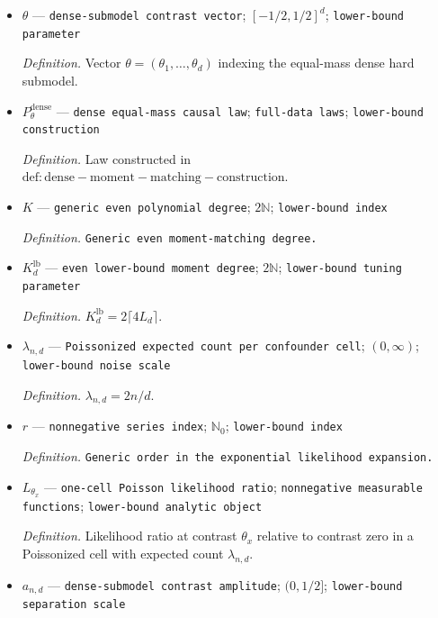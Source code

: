\documentclass{article}
\begin{document}
\begin{itemize}
  \par\smallskip\noindent\emph{Definition.} \texttt{Second probability vector in the normalized two-\allowbreak{}sample distance experiment.}
  \item \(\theta\) --- \texttt{dense-\allowbreak{}submodel contrast vector}; \([-1/2,1/2]^d\); \texttt{lower-\allowbreak{}bound parameter}
  \par\smallskip\noindent\emph{Definition.} Vector \(\theta=(\theta_1,\ldots,\theta_d)\) indexing the equal-mass dense hard submodel.
  \item \(P_\theta^{\mathrm{dense}}\) --- \texttt{dense equal-\allowbreak{}mass causal law}; \texttt{full-\allowbreak{}data laws}; \texttt{lower-\allowbreak{}bound construction}
  \par\smallskip\noindent\emph{Definition.} Law constructed in \(\mathrm{def:dense-moment-matching-construction}\).
  \item \(K\) --- \texttt{generic even polynomial degree}; \(2\mathbb N\); \texttt{lower-\allowbreak{}bound index}
  \par\smallskip\noindent\emph{Definition.} \texttt{Generic even moment-\allowbreak{}matching degree.}
  \item \(K_d^{\mathrm{lb}}\) --- \texttt{even lower-\allowbreak{}bound moment degree}; \(2\mathbb N\); \texttt{lower-\allowbreak{}bound tuning parameter}
  \par\smallskip\noindent\emph{Definition.} \(K_d^{\mathrm{lb}}=2\lceil4L_d\rceil\).
  \item \(\lambda_{n,d}\) --- \texttt{Poissonized expected count per confounder cell}; \((0,\infty)\); \texttt{lower-\allowbreak{}bound noise scale}
  \par\smallskip\noindent\emph{Definition.} \(\lambda_{n,d}=2n/d\).
  \item \(r\) --- \texttt{nonnegative series index}; \(\mathbb N_0\); \texttt{lower-\allowbreak{}bound index}
  \par\smallskip\noindent\emph{Definition.} \texttt{Generic order in the exponential likelihood expansion.}
  \item \(L_{\theta_x}\) --- \texttt{one-\allowbreak{}cell Poisson likelihood ratio}; \texttt{nonnegative measurable functions}; \texttt{lower-\allowbreak{}bound analytic object}
  \par\smallskip\noindent\emph{Definition.} Likelihood ratio at contrast \(\theta_x\) relative to contrast zero in a Poissonized cell with expected count \(\lambda_{n,d}\).
  \item \(a_{n,d}\) --- \texttt{dense-\allowbreak{}submodel contrast amplitude}; \((0,1/2]\); \texttt{lower-\allowbreak{}bound separation scale}

\end{itemize}
\end{document}
